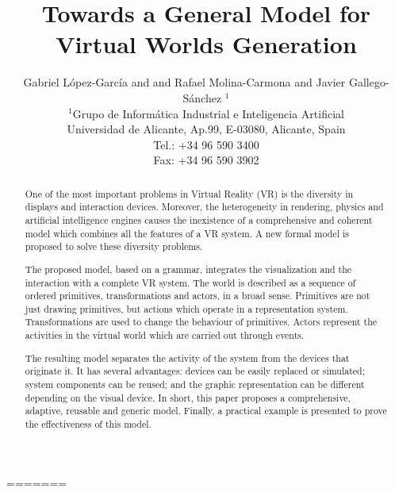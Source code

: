 



=======
\usepackage{amsmath,amssymb}
\usepackage{graphicx}
\usepackage{amsmath}
\usepackage{amssymb}
\usepackage{amsfonts}
\usepackage{textcomp}

\title{Towards a General Model for Virtual Worlds Generation}

\author[G. L\'opez-Garc\'ia \& Rafael Molina-Carmona \& Javier Gallego-S\'anchez]
       {Gabriel L\'opez-Garc\'ia and
        and Rafael Molina-Carmona
        and Javier Gallego-S\'anchez $^{1}$
        \\
		$^1$Grupo de Inform\'atica Industrial e Inteligencia Artificial\\
        Universidad de Alicante, Ap.99, E-03080, Alicante, Spain\\
        Tel.: +34 96 590 3400\\
        Fax:  +34 96 590 3902
       }



\maketitle

\begin{abstract}
One of the most important problems in Virtual Reality (VR) is the diversity in displays and interaction devices. Moreover, the heterogeneity in rendering, physics and artificial intelligence engines causes the inexistence of a comprehensive and coherent model which combines all the features of a VR system. A new formal model is proposed to solve these diversity problems.

The proposed model, based on a grammar, integrates the visualization and the interaction with a complete VR system. The world is described as a sequence of ordered primitives, transformations and actors, in a broad sense. Primitives are not just drawing primitives, but actions which operate in a representation system. Transformations are used to change the behaviour of primitives. Actors represent the activities in the virtual world which are carried out through events.

The resulting model separates the activity of the system from the devices that originate it. It has several advantages: devices can be easily replaced or simulated; system components can be reused; and the graphic representation can be different depending on the visual device. In short, this paper proposes a comprehensive, adaptive, reusable and generic model. Finally, a practical example is presented to prove the effectiveness of this model.

\begin{classification} %
\end{classification}

\end{abstract}

